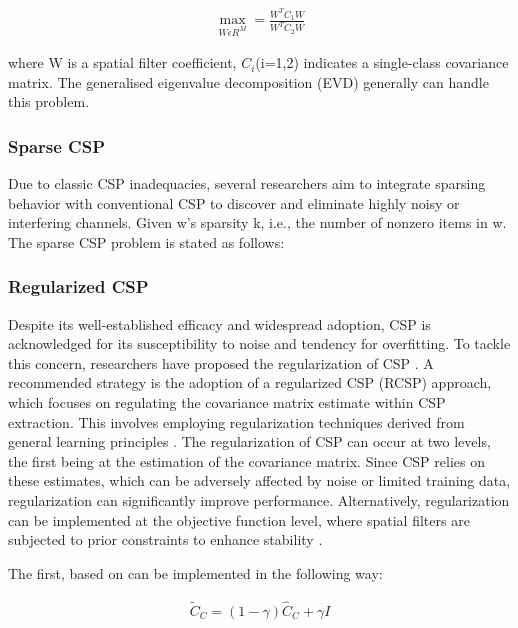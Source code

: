 \documentclass{Configuration_Files/PoliMi3i_thesis}
\begin{document}
\begin{align}
	\max_{W \epsilon R^{M}} = \frac{W^{T} C_1 W}{W^{T} C_2 W}
	\label{eq:CSP1}
\end{align}

where W is a spatial filter coefficient, $C_{i}$(i=1,2) indicates a single-class covariance matrix. The generalised eigenvalue decomposition (EVD) generally can handle this problem. \cite{abdullahEEGChannelSelection2022}

\subsubsection{Sparse CSP}

Due to classic CSP inadequacies, several researchers aim to integrate sparsing behavior with conventional CSP to discover and eliminate highly noisy or interfering channels. Given w’s sparsity k, i.e., the number of nonzero items in w. The sparse CSP problem is stated as follows:

\subsubsection{Regularized CSP}

Despite its well-established efficacy and widespread adoption, CSP is acknowledged for its susceptibility to noise and tendency for overfitting. To tackle this concern, researchers have proposed the regularization of CSP \cite{lotteRegularizingCommonSpatial2011}. A recommended strategy is the adoption of a regularized CSP (RCSP) approach, which focuses on regulating the covariance matrix estimate within CSP extraction. This involves employing regularization techniques derived from general learning principles \cite{friedmanRegularizedDiscriminantAnalysis1989,wangSolvingFaceRecognition2006}. The regularization of CSP can occur at two levels, the first being at the estimation of the covariance matrix. Since CSP relies on these estimates, which can be adversely affected by noise or limited training data, regularization can significantly improve performance. Alternatively, regularization can be implemented at the objective function level, where spatial filters are subjected to prior constraints to enhance stability \cite{lotteRegularizingCommonSpatial2011}.

The first, based on \cite{luRegularizedCommonSpatial2009} can be implemented in the following way:

\begin{align}
	\tilde{C}_{C} = (1 - \gamma) \hat{C}_{C} + \gamma I
	\label{eq:RCSP1}
\end{align}
\end{document}
